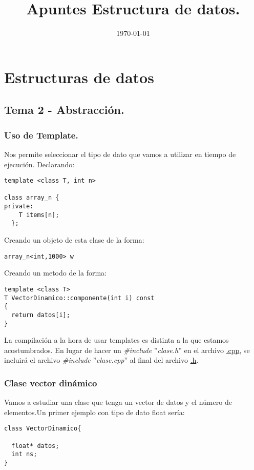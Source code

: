 \documentclass[11pt]{article}
\date{\today}
\title{Apuntes Estructura de datos.}
\begin{document}
\maketitle

\section{Estructuras de datos}
\label{sec-1}
\subsection{Tema 2 - Abstracción.}
\label{sec-1-1}
\subsubsection{Uso de Template.}
\label{sec-1-1-1}

Nos permite seleccionar el tipo de dato que vamos a utilizar en tiempo de ejecución.
Declarando:

\begin{verbatim}
template <class T, int n>

class array_n {
private:
    T items[n];
  };
\end{verbatim}

Creando un objeto de esta clase de la forma:

\begin{verbatim}
array_n<int,1000> w
\end{verbatim}
Creando un metodo de la forma:

\begin{verbatim}
template <class T>
T VectorDinamico::componente(int i) const
{
  return datos[i];
}
\end{verbatim}

La compilación a la hora de usar templates es distinta a la que estamos acostumbrados. En lugar de hacer un \emph{\#include} ''\emph{clase.h}'' en el archivo \uline{.cpp}, se incluirá el archivo \emph{\#include} ''\emph{clase.cpp}'' al final del archivo \uline{.h}.

\subsubsection{Clase vector dinámico}
\label{sec-1-1-2}

Vamos a estudiar una clase que tenga un vector de datos y el número de elementos.Un primer ejemplo con tipo de dato float sería:

\begin{verbatim}
class VectorDinamico{

  float* datos;
  int ns;
}
\end{verbatim}
\end{document}
